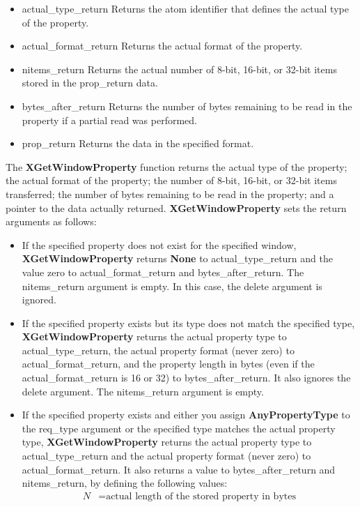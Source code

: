 \documentclass{report}
\begin{document}
\begin{itemize}
\begin{itemize}
            \item actual\_type\_return Returns the atom identifier that defines the actual type of the property.
            \item actual\_format\_return Returns the actual format of the property.
            \item nitems\_return Returns the actual number of 8-bit, 16-bit, or 32-bit items stored in the prop\_return data.
            \item bytes\_after\_return Returns the number of bytes remaining to be read in the property if a partial read was performed.
            \item prop\_return Returns the data in the specified format.
        \end{itemize}
        The \textbf{XGetWindowProperty} function returns the actual type of the property; the actual format of the property; the number of 8-bit, 16-bit, or 32-bit items transferred; the number of bytes remaining to be read in the property; and a pointer to the data actually returned. \textbf{XGetWindowProperty} sets the return arguments as follows:
        \begin{itemize}
            \item If the specified property does not exist for the specified window, \textbf{XGetWindowProperty} returns \textbf{None} to actual\_type\_return and the value zero to actual\_format\_return and bytes\_after\_return. The nitems\_return argument is empty. In this case, the delete argument is ignored.
            \item If the specified property exists but its type does not match the specified type, \textbf{XGetWindowProperty} returns the actual property type to actual\_type\_return, the actual property format (never zero) to actual\_format\_return, and the property length in bytes (even if the actual\_format\_return is 16 or 32) to bytes\_after\_return. It also ignores the delete argument. The nitems\_return argument is empty.
            \item If the specified property exists and either you assign \textbf{AnyPropertyType} to the req\_type argument or the specified type matches the actual property type, \textbf{XGetWindowProperty} returns the actual property type to actual\_type\_return and the actual property format (never zero) to actual\_format\_return. It also returns a value to bytes\_after\_return and nitems\_return, by defining the following values:
                \begin{align*}
                    N &= \text{actual length of the stored property in bytes} \\

\end{align*}
\end{itemize}
\end{itemize}
\end{document}

